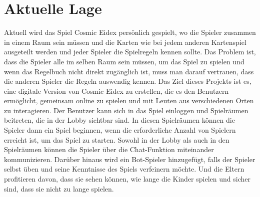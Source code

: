 \section{Aktuelle Lage}

Aktuell wird das Spiel Cosmic Eidex persönlich gespielt, wo die Spieler zusammen in einem Raum sein müssen und die Karten wie bei jedem anderen Kartenspiel ausgeteilt werden und jeder Spieler die Spielregeln kennen sollte. Das Problem ist, dass die Spieler alle im selben Raum sein müssen, um das Spiel zu spielen und wenn das Regelbuch nicht direkt zugänglich ist, muss man darauf vertrauen, dass die anderen Spieler die Regeln auswendig kennen. Das Ziel dieses Projekts ist es, eine digitale Version von Cosmic Eidex zu erstellen, die es den Benutzern ermöglicht, gemeinsam online zu spielen und mit Leuten aus verschiedenen Orten zu interagieren. Der Benutzer kann sich in das Spiel einloggen und Spielräumen beitreten, die in der Lobby sichtbar sind. In diesen Spielräumen können die Spieler dann ein Spiel beginnen, wenn die erforderliche Anzahl von Spielern erreicht ist, um das Spiel zu starten. Sowohl in der Lobby als auch in den Spielräumen können die Spieler über die Chat-Funktion miteinander kommunizieren. Darüber hinaus wird ein Bot-Spieler hinzugefügt, falls der Spieler selbst üben und seine Kenntnisse des Spiels verfeinern möchte. Und die Eltern profitieren davon, dass sie sehen können, wie lange die Kinder spielen und sicher sind, dass sie nicht zu lange spielen. 